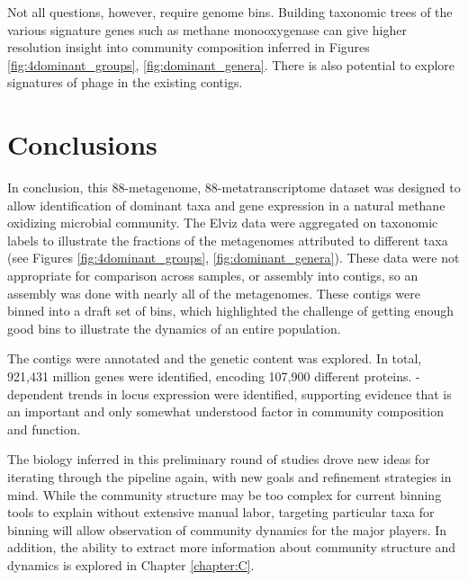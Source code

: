 Not all questions, however, require genome bins.
Building taxonomic trees of the various signature genes such as methane monooxygenase can give higher resolution insight into community composition inferred in Figures \ref{fig:4dominant_groups}, \ref{fig:dominant_genera}.
There is also potential to explore signatures of phage in the existing contigs.


\section{Conclusions}

In conclusion, this 88-metagenome, 88-metatranscriptome dataset was designed to allow identification of dominant taxa and gene expression in a natural methane oxidizing microbial community.
The Elviz data were aggregated on taxonomic labels to illustrate the fractions of the metagenomes attributed to different taxa (see Figures \ref{fig:4dominant_groups}, \ref{fig:dominant_genera}).
These data were not appropriate for comparison across samples, or assembly into contigs, so an assembly was done with nearly all of the metagenomes.
These contigs were binned into a draft set of bins, which highlighted the challenge of getting enough good bins to illustrate the dynamics of an entire population.

The contigs were annotated and the genetic content was explored.
In total, 921,431 million genes were identified, encoding 107,900 different proteins.
-dependent trends in locus expression were identified, supporting evidence that  is an important and only somewhat understood factor in community composition and function.

The biology inferred in this preliminary round of studies drove new ideas for iterating through the pipeline again, with new goals and refinement strategies in mind.
While the community structure may be too complex for current binning tools to explain without extensive manual labor, targeting particular taxa for binning will allow observation of community dynamics for the major players.
In addition, the ability to extract more information about community structure and dynamics is explored in Chapter \ref{chapter:C}.


